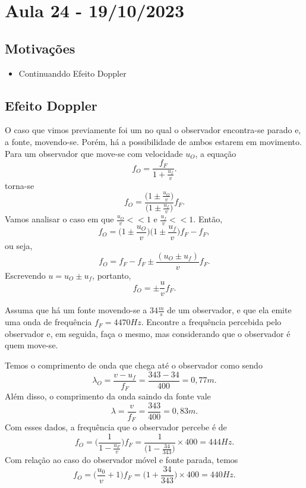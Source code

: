 \documentclass[phsyicsII_notes.tex]{subfiles}
\begin{document}
\section{Aula 24 - 19/10/2023}
\subsection{Motivações}
\begin{itemize}
	\item Continuanddo Efeito Doppler
\end{itemize}
\subsection{Efeito Doppler}
O caso que vimos previamente foi um no qual o observador encontra-se parado e, a fonte, movendo-se. Porém, há a possibilidade de ambos estarem em movimento. Para um observador que
move-se com velocidade \(u_{O}\), a equação
\[
	f_{O} = \frac{f_{F}}{1+\frac{u_{f}}{v}}.
\]
torna-se
\[
	f_{O} = \frac{\biggl(1\pm \frac{u_{O}}{v}\biggr)}{\biggl(1\pm \frac{u_{f}}{v}\biggr)}f_{F}.
\]
Vamos analisar o caso em que \(\frac{u_{O}}{v} << 1\) e \(\frac{u_{f}}{v} << 1\). Então,
\[
	f_{O} = \biggl(1\pm \frac{u_{O}}{v}\biggr)\biggl(1\pm \frac{u_{f}}{v}\biggr)f_{F} - f_{F},
\]
ou seja,
\[
	f_{O} = f_{F} - f_{F}\pm \frac{(u_{O}\pm u_{f})}{v}f_{F}.
\]
Escrevendo \(u = u_{O} \pm u_{f}\), portanto,
\[
	f_{O} = \pm\frac{u}{v}f_{F}.
\]
\begin{example}
	Assuma que há um fonte movendo-se a \(34 \frac{m}{s}\) de um observador, e que ela emite uma onda de frequência \(f_{F} = 4470Hz\). Encontre a frequência percebida pelo
	observador e, em seguida, faça o mesmo, mas considerando que o observador é quem move-se.

	Temos o comprimento de onda que chega até o observador como sendo
	\[
		\lambda_{O} = \frac{v-u_{f}}{f_{F}} = \frac{343-34}{400} = 0,77m.
	\]
	Além disso, o comprimento da onda saindo da fonte vale
	\[
		\lambda = \frac{v}{f_{F}} = \frac{343}{400} = 0,83m.
	\]
	Com esses dados, a frequência que o observador percebe é de
	\[
		f_{O} = \biggl(\frac{1}{1-\frac{u_{F}}{v}}\biggr)f_{F} = \frac{1}{\biggl(1-\frac{34}{343}\biggr)}\times 400 = 444Hz.
	\]
	Com relação ao caso do observador móvel e fonte parada, temos
	\[
		f_{O} = \biggl(\frac{u_{0}}{v}+1\biggr)f_{F} = \biggl(1 + \frac{34}{343}\biggr)\times 400 = 440Hz.
	\]
\end{example}
\end{document}
